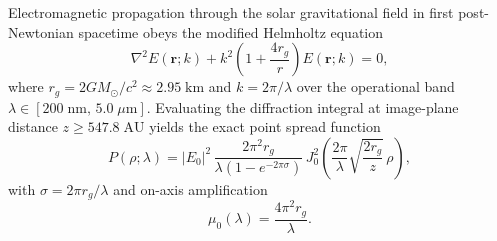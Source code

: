 \documentclass[10pt,twocolumn]{IEEEtran}
\begin{document}
Electromagnetic propagation through the solar gravitational field in
first post-Newtonian spacetime obeys the modified Helmholtz equation
\begin{equation}
\nabla^{2}E(\mathbf{r};k)+k^{2}\left(1+\frac{4r_g}{r}\right)
E(\mathbf{r};k)=0,
\label{eq:helmholtz_1pn}
\end{equation}
where $r_g=2GM_{\odot}/c^{2}\approx2.95\;\mathrm{km}$ and
$k=2\pi/\lambda$ over the operational band
$\lambda\in[200\;\mathrm{nm},\,5.0\;\mu\mathrm{m}]$. Evaluating the
diffraction integral at image-plane distance $z\geq547.8\;\mathrm{AU}$
yields the exact point spread function
\begin{equation}
P(\rho;\lambda)=|E_0|^{2}\,
\frac{2\pi^{2}r_g}{\lambda\left(1-e^{-2\pi\sigma}\right)}\,
J_0^{2}\!\left(\frac{2\pi}{\lambda}\sqrt{\frac{2r_g}{z}}\,\rho\right),
\label{eq:psf_exact}
\end{equation}
with $\sigma=2\pi r_g/\lambda$ and on-axis amplification
\begin{equation}
\mu_0(\lambda)=\frac{4\pi^{2}r_g}{\lambda}.
\label{eq:mu0}
\end{equation}
\end{document}
